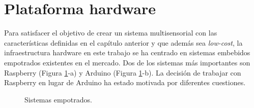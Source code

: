\section{Plataforma hardware}
\label{sec:hw}
Para satisfacer el objetivo de crear un sistema multisensorial con las características definidas en el capítulo anterior y que además sea \textit{low-cost}, la infraestructura hardware en este trabajo se ha centrado en sistemas embebidos empotrados existentes en el mercado. Dos de los sistemas más importantes son Raspberry (Figura \ref{fig:placas}-a) y Arduino (Figura \ref{fig:placas}-b). La decisión de trabajar con Raspberry en lugar de Arduino ha estado motivada por diferentes cuestiones.\\
\begin{figure}[h!]
  \begin{center}
    \hspace{2mm}
  \end{center}
\caption{Sistemas empotrados.} \label{fig:placas}
\end{figure}

